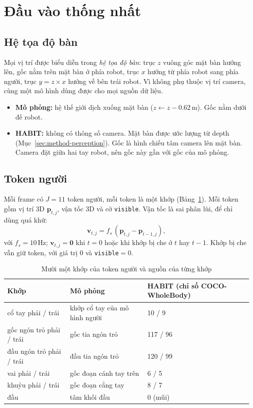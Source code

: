 \section{Đầu vào thống nhất}
\label{sec:method-tokens}

\subsection{Hệ tọa độ bàn}

Mọi vị trí được biểu diễn trong \emph{hệ tọa độ bàn}: trục $z$ vuông góc mặt bàn hướng lên, gốc nằm trên mặt bàn ở phía robot, trục $x$ hướng từ phía robot sang phía người, trục $y=z\times x$ hướng về bên trái robot. Vì không phụ thuộc vị trí camera, cùng một mô hình dùng được cho mọi nguồn dữ liệu.
\begin{itemize}
  \item \textbf{Mô phỏng:} hệ thế giới dịch xuống mặt bàn ($z\leftarrow z-0.62$\,m). Gốc nằm dưới đế robot.
  \item \textbf{HABIT:} không có thông số camera. Mặt bàn được ước lượng từ depth (Mục~\ref{sec:method-perception}). Gốc là hình chiếu tâm camera lên mặt bàn. Camera đặt giữa hai tay robot, nên gốc này gần với gốc của mô phỏng.
\end{itemize}

\subsection{Token người}

Mỗi frame có $J=11$ token người, mỗi token là một khớp (Bảng~\ref{tab:keypoints}). Mỗi token gồm vị trí 3D $\mathbf{p}_{t,j}$, vận tốc 3D và cờ \texttt{visible}. Vận tốc là sai phân lùi, để chỉ dùng quá khứ:
\begin{equation}
  \mathbf{v}_{t,j}=f_s\,(\mathbf{p}_{t,j}-\mathbf{p}_{t-1,j}),
  \label{eq:velocity}
\end{equation}
với $f_s=10$\,Hz; $\mathbf{v}_{t,j}=\mathbf{0}$ khi $t=0$ hoặc khi khớp bị che ở $t$ hay $t-1$. Khớp bị che vẫn giữ token, với giá trị 0 và \texttt{visible}$=0$.

\begin{table}[H]
  \centering
  \caption{Mười một khớp của token người và nguồn của từng khớp}
  \label{tab:keypoints}
  \small
  \begin{tabular}{@{}lll@{}}
    \toprule
    Khớp & Mô phỏng & HABIT (chỉ số COCO-WholeBody) \\
    \midrule
    cổ tay phải / trái & khớp cổ tay của mô hình người & 10 / 9 \\
    gốc ngón trỏ phải / trái & gốc tia ngón trỏ & 117 / 96 \\
    đầu ngón trỏ phải / trái & đầu tia ngón trỏ & 120 / 99 \\
    vai phải / trái & gốc đoạn cánh tay trên & 6 / 5 \\
    khuỷu phải / trái & gốc đoạn cẳng tay & 8 / 7 \\
    đầu & tâm khối đầu & 0 (mũi) \\
    \bottomrule
  \end{tabular}
\end{table}

